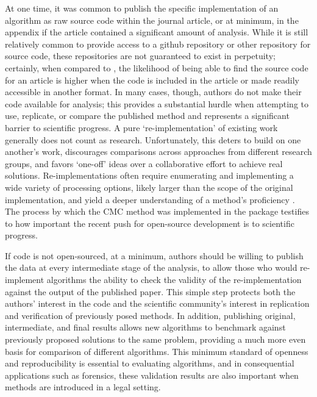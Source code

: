 At one time, it was common to publish the specific implementation of an
algorithm as raw source code \citep{bron_merge_1972} within the journal
article, or at minimum, in the appendix \citep{friend_sorting_1956} if
the article contained a significant amount of analysis. While it is
still relatively common to provide access to a github repository or
other repository for source code, these repositories are not guaranteed
to exist in perpetuity; certainly, when compared to
\citep{bron_merge_1972}, the likelihood of being able to find the source
code for an article is higher when the code is included in the article
or made readily accessible in another format. In many cases, though,
authors do not make their code available for analysis; this provides a
substantial hurdle when attempting to use, replicate, or compare the
published method and represents a significant barrier to scientific
progress. A pure `re-implementation' of existing work generally does not
count as research. Unfortunately, this deters to build on one another's
work, discourages comparisons across approaches from different research
groups, and favors `one-off' ideas over a collaborative effort to
achieve real solutions. Re-implementations often require enumerating and
implementing a wide variety of processing options, likely larger than
the scope of the original implementation, and yield a deeper
understanding of a method's proficiency \citep{Stodden2013SettingTD}.
The process by which the CMC method was implemented in the
 package testifies to how important the recent push for
open-source development is to scientific progress.

If code is not open-sourced, at a minimum, authors should be willing to
publish the data at every intermediate stage of the analysis, to allow
those who would re-implement algorithms the ability to check the
validity of the re-implementation against the output of the published
paper. This simple step protects both the authors' interest in the code
and the scientific community's interest in replication and verification
of previously posed methods. In addition, publishing original,
intermediate, and final results allows new algorithms to benchmark
against previously proposed solutions to the same problem, providing a
much more even basis for comparison of different algorithms. This
minimum standard of openness and reproducibility is essential to
evaluating algorithms, and in consequential applications such as
forensics, these validation results are also important when methods are
introduced in a legal setting.

